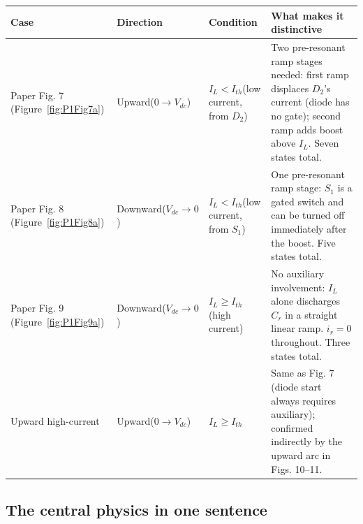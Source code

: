 \documentclass[12pt, a4paper]{article}
\def\,{ }%
\newcommand{\Vdc}{V_{dc}}
\newcommand{\ir}{i_r}
\newcommand{\IL}{I_L}
\newcommand{\Ith}{I_{th}}
\newcommand{\figref}[1]{Figure~\ref{#1}}
\begin{document}
\begin{center}
\renewcommand{\arraystretch}{1.4}
\begin{tabular}{p{1.5cm} p{3.5cm} p{3.5cm} p{4.3cm}}
\toprule
\textbf{Case} & \textbf{Direction} & \textbf{Condition} & \textbf{What makes it distinctive} \\
\midrule
Paper Fig.\,7
(\figref{fig:P1Fig7a})
& Upward\newline($0 \to \Vdc$)
& $\IL < \Ith$\newline(low current, from $D_2$)
& Two pre-resonant ramp stages needed: first ramp displaces $D_2$'s current
  (diode has no gate); second ramp adds boost above $\IL$. Seven states total. \\
\midrule
Paper Fig.\,8
(\figref{fig:P1Fig8a})
& Downward\newline($\Vdc \to 0$)
& $\IL < \Ith$\newline(low current, from $S_1$)
& One pre-resonant ramp stage: $S_1$ is a gated switch and can be turned off
  immediately after the boost. Five states total. \\
\midrule
Paper Fig.\,9
(\figref{fig:P1Fig9a})
& Downward\newline($\Vdc \to 0$)
& $\IL \geq \Ith$\newline(high current)
& No auxiliary involvement: $\IL$ alone discharges $C_r$ in a straight linear
  ramp. $\ir = 0$ throughout. Three states total. \\
\midrule
Upward high-current
& Upward\newline($0 \to \Vdc$)
& $\IL \geq \Ith$
& Same as Fig.\,7 (diode start always requires auxiliary); confirmed
  indirectly by the upward arc in Figs.\,10--11. \\
\bottomrule
\end{tabular}
\end{center}

\subsection*{The central physics in one sentence}
\end{document}
